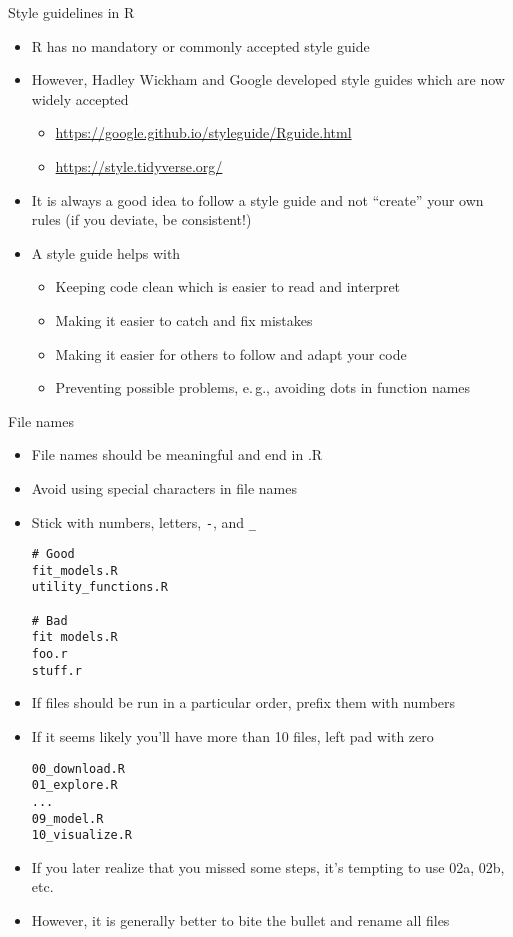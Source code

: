 \documentclass[aspectratio=169]{beamer}
\begin{document}
\begin{frame}[<+->]{Style guidelines in R}
  \begin{itemize}
    \item R has no mandatory or commonly accepted style guide
    \item However, Hadley Wickham and Google developed style guides which are
      now widely accepted
      \begin{itemize}
        \item \url{https://google.github.io/styleguide/Rguide.html}
        \item \url{https://style.tidyverse.org/}
      \end{itemize}
    \item It is always a good idea to follow a style guide and not ``create''
      your own rules (if you deviate, be consistent!)
    \item A style guide helps with
      \begin{itemize}
        \item Keeping code clean which is easier to read and interpret
        \item Making it easier to catch and fix mistakes
        \item Making it easier for others to follow and adapt your code
        \item Preventing possible problems, e.\,g., avoiding dots in function
          names
      \end{itemize}
  \end{itemize}
  \nocite{Wickham_styleguide, Anderson2023}
\end{frame}

\begin{frame}{File names}
  \begin{itemize}
    \item File names should be meaningful and end in .R
    \item Avoid using special characters in file names
    \item Stick with numbers, letters, \verb+-+, and \verb+_+
  \begin{lstlisting}[identifierstyle = \bfseries\color{iwmgray}]
# Good
fit_models.R
utility_functions.R

# Bad
fit models.R
foo.r
stuff.r
  \end{lstlisting}
      \framebreak

    \item If files should be run in a particular order, prefix them with numbers
    \item If it seems likely you’ll have more than 10 files, left pad with zero
  \begin{lstlisting}[identifierstyle = \bfseries\color{iwmgray}]
00_download.R
01_explore.R
...
09_model.R
10_visualize.R
  \end{lstlisting}
    \item If you later realize that you missed some steps, it’s tempting to use
      02a, 02b, etc.
    \item However, it is generally better to bite the bullet and rename all
      files
  \end{itemize}
\end{frame}
\end{document}
